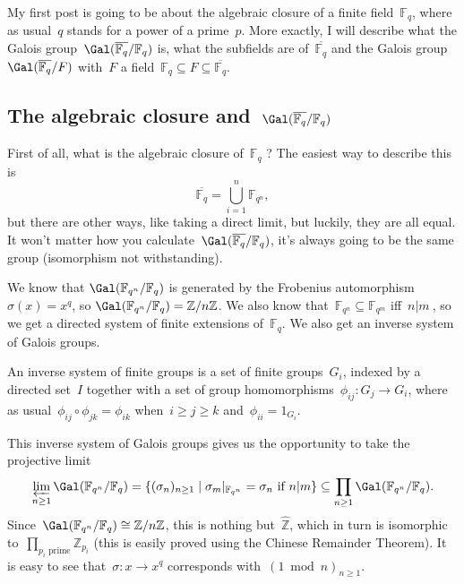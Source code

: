 My first post is going to be about the algebraic closure of a finite field~$\mathbb{F}_q$, where as usual~$q$ stands for a power of a prime~$p$. More exactly, I will describe what the Galois group~$\Gal(\overline{\mathbb{F}_q}/\mathbb{F}_q)$ is, what the subfields are of~$\overline{\mathbb{F}_q}$ and the Galois group~$\Gal(\overline{\mathbb{F}_q}/F)$ with~$F$ a field~$\mathbb{F}_q \subseteq F \subseteq \overline{\mathbb{F}_q}$.

\subsection{The algebraic closure and~$\Gal(\overline{\mathbb{F}_q}/\mathbb{F}_q)$}
First of all, what is the algebraic closure of~$\mathbb{F}_q$ ? The easiest way to describe this is
\begin{equation}
  \overline{\mathbb{F}_q} = \bigcup_{i=1}^n \mathbb{F}_{q^n}, 
\end{equation}
but there are other ways, like taking a direct limit, but luckily, they are all equal. It won't matter how you calculate $\Gal(\overline{\mathbb{F}_q}/\mathbb{F}_q)$, it's always going to be the same group (isomorphism not withstanding).

We know that $\Gal(\mathbb{F}_{q^n}/\mathbb{F}_q)$ is generated by the Frobenius automorphism~$\sigma(x) = x^q$, so $\Gal(\mathbb{F}_{q^n}/\mathbb{F}_q) = \mathbb{Z}/n\mathbb{Z}$. We also know that~$\mathbb{F}_{q^n} \subseteq \mathbb{F}_{q^m}$ iff~$n |m~$, so we get a directed system of finite extensions of~$\mathbb{F}_q$. We also get an inverse system of Galois groups.

\begin{definition}
  An inverse system of finite groups is a set of finite groups~$G_i$, indexed by a directed set~$I$ together with a set of group homomorphisms~$\phi_{ij}:G_j \rightarrow G_i$, where as usual~$\phi_{ij} \circ \phi_{jk} = \phi_{ik}$ when~$i \geq j \geq k$ and~$\phi_{ii} = 1_{G_i}$.
\end{definition}

This inverse system of Galois groups gives us the opportunity to take the projective limit
\begin{equation}
  \varprojlim_{n \geq 1} \Gal(\mathbb{F}_{q^n}/\mathbb{F}_q) = \{ (\sigma_{n})_{n \geq 1} \mid \sigma_m|_{\mathbb{F}_{q^n}} = \sigma_{n} \text{ if } n|m \} \subseteq \prod_{n \geq 1} \Gal(\mathbb{F}_{q^n}/\mathbb{F}_q). 
\end{equation}
Since~$\Gal(\mathbb{F}_{q^n}/\mathbb{F}_q) \cong\mathbb{Z}/n\mathbb{Z}$, this is nothing but~$\widehat{\mathbb{Z}}$, which in turn is isomorphic to~$\prod_{p_{i} \text{ prime}} \mathbb{Z}_{p_{i}}$ (this is easily proved using the Chinese Remainder Theorem). It is easy to see that~$\sigma:x \rightarrow x^q$ corresponds with~$(1 \bmod n)_{n \geq 1}$.

